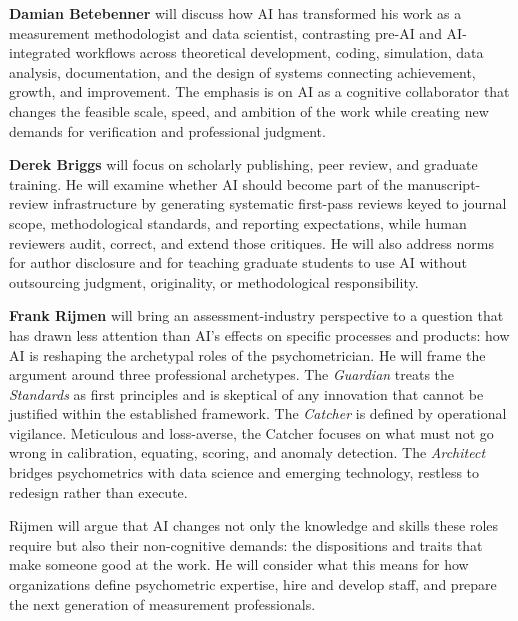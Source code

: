 \documentclass[11pt]{article}
\begin{document}
\textbf{Damian Betebenner} will discuss how AI has transformed his work as a
measurement methodologist and data scientist, contrasting pre-AI and
AI-integrated workflows across theoretical development, coding, simulation, data
analysis, documentation, and the design of systems connecting achievement,
growth, and improvement. The emphasis is on AI as a
cognitive collaborator that changes the feasible scale, speed, and ambition of the
work while creating new demands for verification and professional judgment.

\textbf{Derek Briggs} will focus on scholarly publishing, peer review, and
graduate training. He will examine whether AI should become part of the
manuscript-review infrastructure by generating systematic first-pass reviews
keyed to journal scope, methodological standards, and reporting expectations,
while human reviewers audit, correct, and extend those critiques. He will also
address norms for author disclosure and for teaching graduate students to use AI
without outsourcing judgment, originality, or methodological responsibility.

\textbf{Frank Rijmen} will bring an assessment-industry perspective to a
question that has drawn less attention than AI's effects on specific processes
and products: how AI is reshaping the archetypal roles of the psychometrician.
He will frame the argument around three professional archetypes. The
\emph{Guardian} treats the \emph{Standards} as first principles and is skeptical
of any innovation that cannot be justified within the established framework. The
\emph{Catcher} is defined by operational vigilance. Meticulous and loss-averse,
the Catcher focuses on what must not go wrong in calibration, equating, scoring,
and anomaly detection. The \emph{Architect} bridges psychometrics with data
science and emerging technology, restless to redesign rather than execute.

Rijmen will argue that AI changes not only the knowledge and skills these roles
require but also their non-cognitive demands: the dispositions and traits that
make someone good at the work. He will consider what this means for how
organizations define psychometric expertise, hire and develop staff, and prepare
the next generation of measurement professionals.
\end{document}
